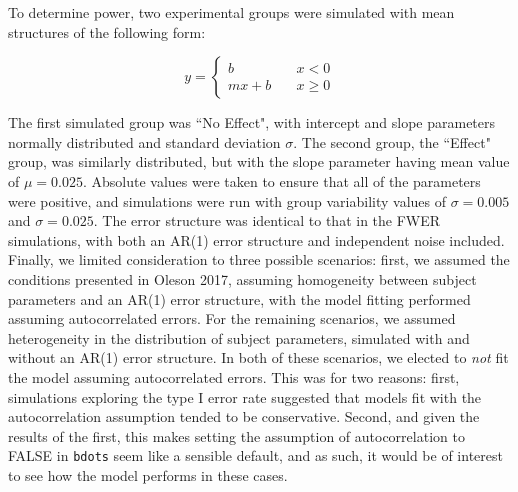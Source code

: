 \documentclass{article}
\newcommand{\xt}{\texttt}
\begin{document}
To determine power, two experimental groups were simulated with mean structures of the following form:

\begin{equation}\label{eq:piecewise_form}
y = \begin{cases}
b \quad &x < 0 \\
mx + b \quad &x \geq 0
\end{cases}
\end{equation}

The first simulated group was ``No Effect", with intercept and slope parameters normally distributed and standard deviation $\sigma$. The second group, the ``Effect" group, was similarly distributed, but with the slope parameter having mean value of $\mu = 0.025$. Absolute values were taken to ensure that all of the parameters were positive, and simulations were run with group variability values of $\sigma = 0.005$ and $\sigma = 0.025$. The error structure was identical to that in the FWER simulations, with both an AR(1) error structure and independent noise included. Finally, we limited consideration to three possible scenarios: first, we assumed the conditions presented in Oleson 2017, assuming homogeneity between subject parameters and an AR(1) error structure, with the model fitting performed assuming autocorrelated errors. For the remaining scenarios, we assumed heterogeneity in the distribution of subject parameters, simulated with and without an AR(1) error structure. In both of these scenarios, we elected to \textit{not} fit the model assuming autocorrelated errors. This was for two reasons: first, simulations exploring the type I error rate suggested that models fit with the autocorrelation assumption tended to be conservative. Second, and given the results of the first, this makes setting the assumption of autocorrelation to FALSE in \xt{bdots} seem like a sensible default, and as such, it would be of interest to see how the model performs in these cases.
\end{document}
